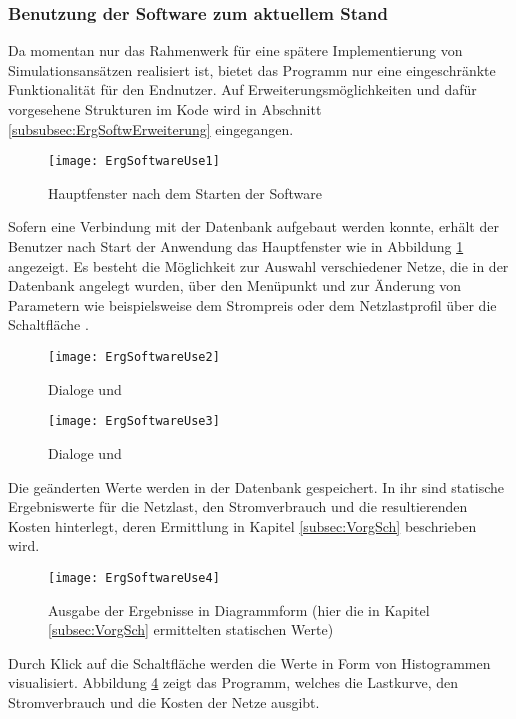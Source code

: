\subsubsection{Benutzung der Software zum aktuellem Stand}
Da momentan nur das Rahmenwerk für eine spätere Implementierung von Simulationsansätzen realisiert ist, bietet das Programm nur eine eingeschränkte Funktionalität für den Endnutzer. Auf Erweiterungsmöglichkeiten und dafür vorgesehene Strukturen im Kode wird in Abschnitt \ref{subsubsec:ErgSoftwErweiterung} eingegangen.
\begin{figure}[htb]
	\centering
	\texttt{[image: ErgSoftwareUse1]}
	\caption{Hauptfenster nach dem Starten der Software}
	\label{fig:ErgSoftwareUse1}
\end{figure}
Sofern eine Verbindung mit der Datenbank aufgebaut werden konnte, erhält der Benutzer nach Start der Anwendung das Hauptfenster wie in Abbildung \ref{fig:ErgSoftwareUse1} angezeigt. Es besteht die Möglichkeit zur Auswahl verschiedener Netze, die in der Datenbank angelegt wurden, über den Menüpunkt  und zur Änderung von Parametern wie beispielsweise dem Strompreis oder dem Netzlastprofil über die Schaltfläche .
\begin{figure}[htb]
	\centering
	\texttt{[image: ErgSoftwareUse2]}
	\caption{Dialoge  und }
	\label{fig:ErgSoftwareUse2}
\end{figure}
\begin{figure}[htb]
	\centering
	\texttt{[image: ErgSoftwareUse3]}
	\caption{Dialoge  und }
	\label{fig:ErgSoftwareUse3}
\end{figure}
Die geänderten Werte werden in der Datenbank gespeichert. In ihr sind statische Ergebniswerte für die Netzlast, den Stromverbrauch und die resultierenden Kosten hinterlegt, deren Ermittlung in Kapitel \ref{subsec:VorgSch} beschrieben wird.
\begin{figure}[htb]
	\centering
	\texttt{[image: ErgSoftwareUse4]}
	\caption{Ausgabe der Ergebnisse in Diagrammform (hier die in Kapitel \ref{subsec:VorgSch} ermittelten statischen Werte)}
	\label{fig:ErgSoftwareUse4}
\end{figure}
Durch Klick auf die Schaltfläche  werden die Werte in Form von Histogrammen visualisiert. Abbildung \ref{fig:ErgSoftwareUse4} zeigt das Programm, welches die Lastkurve, den Stromverbrauch und die Kosten der Netze ausgibt.

